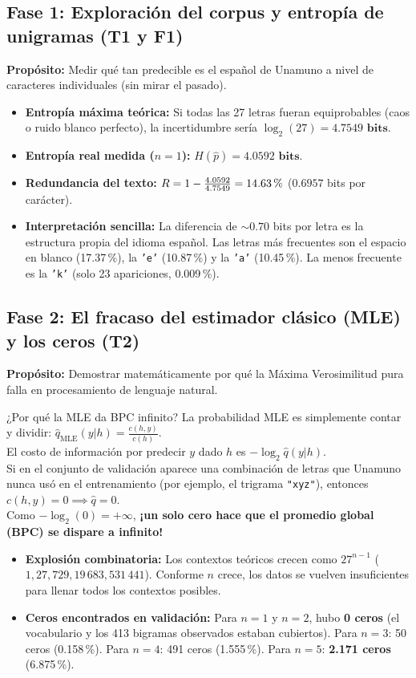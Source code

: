 \documentclass[11pt,letterpaper]{article}
\begin{document}
\subsection{Fase 1: Exploración del corpus y entropía de unigramas (T1 y F1)}
\textbf{Propósito:} Medir qué tan predecible es el español de Unamuno a nivel de caracteres individuales (sin mirar el pasado).
\begin{itemize}[leftmargin=*, nosep]
    \item \textbf{Entropía máxima teórica:} Si todas las 27 letras fueran equiprobables (caos o ruido blanco perfecto), la incertidumbre sería $\log_2(27) = \mathbf{4.7549\text{ bits}}$.
    \item \textbf{Entropía real medida ($n=1$):} $H(\hat{p}) = \mathbf{4.0592\text{ bits}}$.
    \item \textbf{Redundancia del texto:} $R = 1 - \frac{4.0592}{4.7549} = \text{14.63\,\%}$ ($0.6957$ bits por carácter).
    \item \textbf{Interpretación sencilla:} La diferencia de $\sim 0.70$ bits por letra es la estructura propia del idioma español. Las letras más frecuentes son el espacio en blanco (17.37\,\%), la \texttt{'e'} (10.87\,\%) y la \texttt{'a'} (10.45\,\%). La menos frecuente es la \texttt{'k'} (solo 23 apariciones, 0.009\,\%).
\end{itemize}

\subsection{Fase 2: El fracaso del estimador clásico (MLE) y los ceros (T2)}
\textbf{Propósito:} Demostrar matemáticamente por qué la Máxima Verosimilitud pura falla en procesamiento de lenguaje natural.
\begin{conceptbox}{¿Por qué la MLE da BPC infinito?}
La probabilidad MLE es simplemente contar y dividir: $\hat{q}_{\text{MLE}}(y|h) = \frac{c(h,y)}{c(h)}$.\\
El costo de información por predecir $y$ dado $h$ es $-\log_2 \hat{q}(y|h)$.\\
Si en el conjunto de validación aparece una combinación de letras que Unamuno nunca usó en el entrenamiento (por ejemplo, el trigrama \texttt{"xyz"}), entonces $c(h,y) = 0 \implies \hat{q} = 0$.\\
Como $-\log_2(0) = +\infty$, \textbf{¡un solo cero hace que el promedio global (BPC) se dispare a infinito!}
\end{conceptbox}

\begin{itemize}[leftmargin=*, nosep]
    \item \textbf{Explosión combinatoria:} Los contextos teóricos crecen como $27^{n-1}$ ($1, 27, 729, 19\,683, 531\,441$). Conforme $n$ crece, los datos se vuelven insuficientes para llenar todos los contextos posibles.
    \item \textbf{Ceros encontrados en validación:} Para $n=1$ y $n=2$, hubo \textbf{0 ceros} (el vocabulario y los 413 bigramas observados estaban cubiertos). Para $n=3$: 50 ceros (0.158\,\%). Para $n=4$: 491 ceros (1.555\,\%). Para $n=5$: \textbf{2.171 ceros} (6.875\,\%).
\end{itemize}
\end{document}
